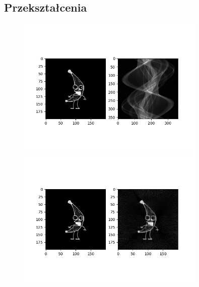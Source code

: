 \documentclass{article}
\begin{document}
\subsection{Przekształcenia}
\begin{figure}[H]
\begin{center}
\includegraphics[width=0.8\textwidth]{./banana/sinogram.jpg}
\includegraphics[width=0.8\textwidth]{./banana/reconstructedImg2.png}
\end{center}
\end{figure}
\end{document}
